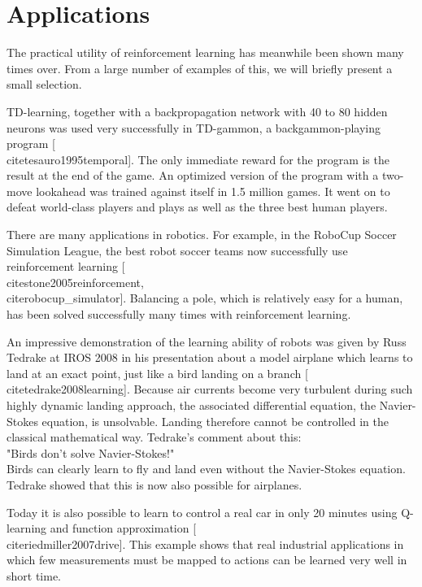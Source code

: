 \documentclass[10pt]{book}
\begin{document}
\section{Applications}
The practical utility of reinforcement learning has meanwhile been shown many times over. From a large number of examples of this, we will briefly present a small selection.

TD-learning, together with a backpropagation network with 40 to 80 hidden neurons was used very successfully in TD-gammon, a backgammon-playing program [\\cite{tesauro1995temporal}]. The only immediate reward for the program is the result at the end of the game. An optimized version of the program with a two-move lookahead was trained against itself in 1.5 million games. It went on to defeat world-class players and plays as well as the three best human players.

There are many applications in robotics. For example, in the RoboCup Soccer Simulation League, the best robot soccer teams now successfully use reinforcement learning [\\cite{stone2005reinforcement}, \\cite{robocup_simulator}]. Balancing a pole, which is relatively easy for a human, has been solved successfully many times with reinforcement learning.

An impressive demonstration of the learning ability of robots was given by Russ Tedrake at IROS 2008 in his presentation about a model airplane which learns to land at an exact point, just like a bird landing on a branch [\\cite{tedrake2008learning}]. Because air currents become very turbulent during such highly dynamic landing approach, the associated differential equation, the Navier-Stokes equation, is unsolvable. Landing therefore cannot be controlled in the classical mathematical way. Tedrake's comment about this:\\
"Birds don't solve Navier-Stokes!"\\
Birds can clearly learn to fly and land even without the Navier-Stokes equation. Tedrake showed that this is now also possible for airplanes.

Today it is also possible to learn to control a real car in only 20 minutes using Q-learning and function approximation [\\cite{riedmiller2007drive}]. This example shows that real industrial applications in which few measurements must be mapped to actions can be learned very well in short time.
\end{document}
